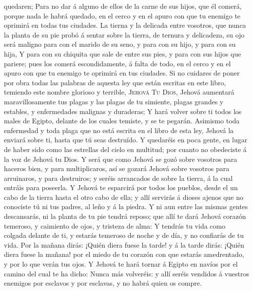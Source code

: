 quedaren;  Para no dar á alguno de ellos de la carne de
sus hijos, que él comerá, porque nada le habrá quedado, en el cerco y en
el apuro con que tu enemigo te oprimirá en todas tus ciudades.
 La tierna y la delicada entre vosotros, que nunca la
planta de su pie probó á sentar sobre la tierra, de ternura y
delicadeza, su ojo será maligno para con el marido de su seno, y para
con su hijo, y para con su hija,  Y para con su chiquita
que sale de entre sus pies, y para con sus hijos que pariere; pues los
comerá escondidamente, á falta de todo, en el cerco y en el apuro con
que tu enemigo te oprimirá en tus ciudades.  Si no
cuidares de poner por obra todas las palabras de aquesta ley que están
escritas en este libro, temiendo este nombre glorioso y terrible,
\textsc{Jehová} \textsc{Tu} \textsc{Dios},  Jehová
aumentará maravillosamente tus plagas y las plagas de tu simiente,
plagas grandes y estables, y enfermedades malignas y duraderas;
 Y hará volver sobre ti todos los males de Egipto,
delante de los cuales temiste, y se te pegarán.  Asimismo
toda enfermedad y toda plaga que no está escrita en el libro de esta
ley, Jehová la enviará sobre ti, hasta que tú seas destruído.
 Y quedaréis en poca gente, en lugar de haber sido como
las estrellas del cielo en multitud; por cuanto no obedeciste á la voz
de Jehová tu Dios.  Y será que como Jehová se gozó sobre
vosotros para haceros bien, y para multiplicaros, así se gozará Jehová
sobre vosotros para arruinaros, y para destruiros; y seréis arrancados
de sobre la tierra, á la cual entráis para poseerla.  Y
Jehová te esparcirá por todos los pueblos, desde el un cabo de la tierra
hasta el otro cabo de ella; y allí servirás á dioses ajenos que no
conociste tú ni tus padres, al leño y á la piedra.  Y ni
aun entre las mismas gentes descansarás, ni la planta de tu pie tendrá
reposo; que allí te dará Jehová corazón temeroso, y caimiento de ojos, y
tristeza de alma:  Y tendrás tu vida como colgada delante
de ti, y estarás temeroso de noche y de día, y no confiarás de tu vida.
 Por la mañana dirás: ¡Quién diera fuese la tarde! y á la
tarde dirás: ¡Quién diera fuese la mañana! por el miedo de tu corazón
con que estarás amedrentado, y por lo que verán tus ojos.
 Y Jehová te hará tornar á Egipto en navíos por el camino
del cual te ha dicho: Nunca más volveréis: y allí seréis vendidos á
vuestros enemigos por esclavos y por esclavas, y no habrá quien os
compre.

